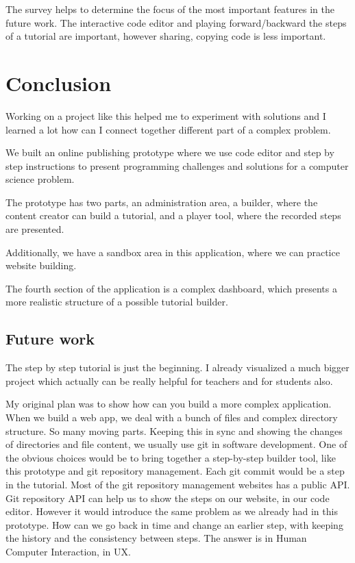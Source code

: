 \documentclass[12pt, a4paper, oneside, openright, medskipamount]{report}
\begin{document}
The survey helps to determine the focus of the most important features in the future work. The interactive code editor and playing forward/backward the steps of a tutorial are important, however sharing, copying code is less important.

\section{Conclusion}

Working on a project like this helped me to experiment with solutions and I learned a lot how can I connect together different part of a complex problem.

We built an online publishing prototype where we use code editor and step by step instructions to present programming challenges and solutions for a computer science problem.

The prototype has two parts, an administration area, a builder, where the content creator can build a tutorial, and a player tool, where the recorded steps are presented.

Additionally, we have a sandbox area in this application, where we can practice website building.

The fourth section of the application is a complex dashboard, which presents a more realistic structure of a possible tutorial builder.

\subsection{Future work}

The step by step tutorial is just the beginning. I already visualized a much bigger project which actually can be really helpful for teachers and for students also.

My original plan was to show how can you build a more complex application. When we build a web app, we deal with a bunch of files and complex directory structure. So many moving parts. Keeping this in sync and showing the changes of directories and file content, we usually use git in software development. One of the obvious choices would be to bring together a step-by-step builder tool, like this prototype and git repository management. Each git commit would be a step in the tutorial. Most of the git repository management websites has a public API. Git repository API can help us to show the steps on our website, in our code editor. However it would introduce the same problem as we already had in this prototype. How can we go back in time and change an earlier step, with keeping the history and the consistency between steps. The answer is in Human Computer Interaction, in UX.
\end{document}
